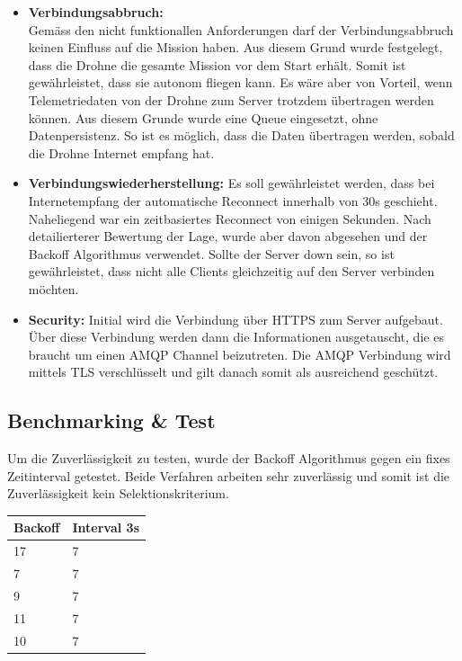 \begin{itemize}
	\item{\textbf{Verbindungsabbruch:} \\
	Gemäss den nicht funktionallen Anforderungen darf der Verbindungsabbruch keinen Einfluss auf die Mission haben. Aus diesem Grund wurde festgelegt, dass die Drohne die gesamte Mission vor dem Start erhält. Somit ist gewährleistet, dass sie autonom fliegen kann. Es wäre aber von Vorteil, wenn Telemetriedaten von der Drohne zum Server trotzdem übertragen werden können. Aus diesem Grunde wurde eine Queue eingesetzt, ohne Datenpersistenz. So ist es möglich, dass die Daten übertragen werden, sobald die Drohne Internet empfang hat.}
	\item{\textbf{Verbindungswiederherstellung:}
	Es soll gewährleistet werden, dass bei Internetempfang der automatische Reconnect innerhalb von 30s geschieht. Naheliegend war ein zeitbasiertes Reconnect von einigen Sekunden. Nach detailierterer Bewertung der Lage, wurde aber davon abgesehen und der Backoff Algorithmus verwendet. Sollte der Server down sein, so ist gewährleistet, dass nicht alle Clients gleichzeitig auf den Server verbinden möchten.}
	\item{\textbf{Security:} 
	Initial wird die Verbindung über HTTPS zum Server aufgebaut. Über diese Verbindung werden dann die Informationen ausgetauscht, die es braucht um einen AMQP Channel beizutreten. Die AMQP Verbindung wird mittels TLS verschlüsselt und gilt danach somit als ausreichend geschützt.}

\end{itemize}

\subsection{Benchmarking \& Test}
Um die Zuverlässigkeit zu testen, wurde der Backoff Algorithmus gegen ein fixes Zeitinterval getestet. Beide Verfahren arbeiten sehr zuverlässig und somit ist die Zuverlässigkeit kein Selektionskriterium.
\begin{center}
	\begin{tabular}{|l|l|}
	\hline
	  \textbf{Backoff} & \textbf{Interval 3s} \\
	\hline
	  17 & 7 \\
	  7 & 7 \\
	  9 & 7 \\
	  11 & 7 \\
	  10 & 7 \\
	\hline
	\end{tabular}
\end{center}

